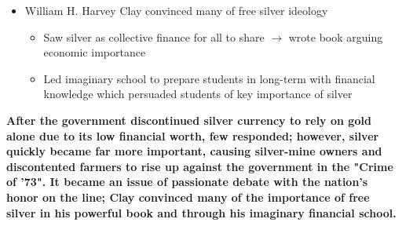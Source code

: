 \documentclass[a4paper]{article}
\begin{document}
{\begin{itemize}
\begin{itemize}
                \item William H. Harvey Clay convinced many of free silver ideology
                \begin{itemize}
                    \item Saw silver as collective finance for all to share $\to$ wrote book arguing economic importance
                    \item Led imaginary school to prepare students in long-term with financial knowledge which persuaded students of key importance of silver
                \end{itemize}
            \end{itemize}
        \end{itemize}
        \textbf{After the government discontinued silver currency to rely on gold alone due to its low financial worth, few responded; however, silver quickly became far more important, causing silver-mine owners and discontented farmers to rise up against the government in the "Crime of '73". It became an issue of passionate debate with the nation's honor on the line; Clay convinced many of the importance of free silver in his powerful book and through his imaginary financial school.}}
\end{document}
